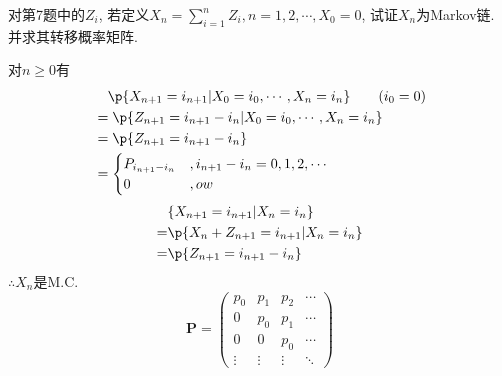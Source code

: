 \begin{problem}{3.10}
对第7题中的$Z_i$, 若定义$X_n = \sum\limits^n_{i=1}Z_i, n = 1, 2, \cdots, X_0 = 0$, 试证$X_n$为Markov链. 并求其转移概率矩阵.
\end{problem}
\begin{solution}
	对$n \geqslant 0$有
	\[\begin{split}
			& \quad \p\{X_{n+1} = i_{n+1} | X_0 = i_0, \cdots, X_n = i_n\} \qquad (i_0 = 0)\\
			& = \p\{Z_{n+1} = i_{n+1} - i_n | X_0 = i_0, \cdots, X_n = i_n\}\\
			& = \p\{Z_{n+1} = i_{n+1} - i_n\}\\
			& = \begin{cases}
				P_{i_{n+1}-i_n} & , i_{n+1} - i_n = 0,1,2,\cdots \\
				0               & , ow
			\end{cases}
		\end{split}\]
	\[\begin{split}
			& \{X_{n+1} = i_{n+1} | X_n = i_n\}\\
			= & \p\{X_{n} + Z_{n+1} = i_{n+1} | X_n = i_n\}\\
			= & \p\{Z_{n+1} = i_{n+1} - i_n\}
		\end{split}\]
	$\therefore X_n $是M.C.
	\[\bm{P} =
		\begin{pmatrix}
			p_0    & p_1    & p_2    & \cdots \\
			0      & p_0    & p_1    & \cdots \\
			0      & 0      & p_0    & \cdots \\
			\vdots & \vdots & \vdots & \ddots
		\end{pmatrix}
	\]
\end{solution}

